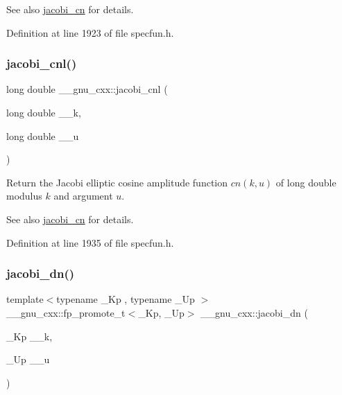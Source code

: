 \begin{DoxySeeAlso}{See also}
\hyperlink{group__gnu__math__spec__func_ga2e1c43b232d378164bed1433041ca7dc}{jacobi\+\_\+cn} for details. 
\end{DoxySeeAlso}


Definition at line 1923 of file specfun.\+h.

\mbox{\label{group__gnu__math__spec__func_ga08892965ea520116cc53a764513fe685}} 
\subsubsection{\texorpdfstring{jacobi\+\_\+cnl()}{jacobi\_cnl()}}
{\footnotesize\ttfamily long double \+\_\+\+\_\+gnu\+\_\+cxx\+::jacobi\+\_\+cnl (\begin{DoxyParamCaption}\item[{long double}]{\+\_\+\+\_\+k,  }\item[{long double}]{\+\_\+\+\_\+u }\end{DoxyParamCaption})\hspace{0.3cm}{\ttfamily [inline]}}

Return the Jacobi elliptic cosine amplitude function $ cn(k,u) $ of {\ttfamily long double} modulus $ k $ and argument $ u $.

\begin{DoxySeeAlso}{See also}
\hyperlink{group__gnu__math__spec__func_ga2e1c43b232d378164bed1433041ca7dc}{jacobi\+\_\+cn} for details. 
\end{DoxySeeAlso}


Definition at line 1935 of file specfun.\+h.

\mbox{\label{group__gnu__math__spec__func_ga0f8fa8d6a77dbc2089d65f3f16876aa9}} 
\subsubsection{\texorpdfstring{jacobi\+\_\+dn()}{jacobi\_dn()}}
{\footnotesize\ttfamily template$<$typename \+\_\+\+Kp , typename \+\_\+\+Up $>$ \\
\+\_\+\+\_\+gnu\+\_\+cxx\+::fp\+\_\+promote\+\_\+t$<$\+\_\+\+Kp, \+\_\+\+Up$>$ \+\_\+\+\_\+gnu\+\_\+cxx\+::jacobi\+\_\+dn (\begin{DoxyParamCaption}\item[{\+\_\+\+Kp}]{\+\_\+\+\_\+k,  }\item[{\+\_\+\+Up}]{\+\_\+\+\_\+u }\end{DoxyParamCaption})\hspace{0.3cm}{\ttfamily [inline]}}

